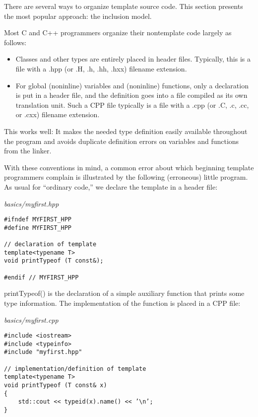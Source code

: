

There are several ways to organize template source code. This section presents the most popular approach: the inclusion model.


Most C and C++ programmers organize their nontemplate code largely as follows:

\begin{itemize}
\item
Classes and other types are entirely placed in header files. Typically, this is a file with a .hpp (or .H, .h, .hh, .hxx) filename extension.

\item
For global (noninline) variables and (noninline) functions, only a declaration is put in a header file, and the definition goes into a file compiled as its own translation unit. Such a CPP file typically is a file with a .cpp (or .C, .c, .cc, or .cxx) filename extension.
\end{itemize}

This works well: It makes the needed type definition easily available throughout the program and avoids duplicate definition errors on variables and functions from the linker.

With these conventions in mind, a common error about which beginning template programmers complain is illustrated by the following (erroneous) little program. As usual for “ordinary code,” we declare the template in a header file:

\noindent
\textit{basics/myfirst.hpp}
\begin{lstlisting}[style=styleCXX]
#ifndef MYFIRST_HPP
#define MYFIRST_HPP

// declaration of template
template<typename T>
void printTypeof (T const&);

#endif // MYFIRST_HPP
\end{lstlisting}

printTypeof() is the declaration of a simple auxiliary function that prints some type information. The implementation of the function is placed in a CPP file:


\noindent
\textit{basics/myfirst.cpp}
\begin{lstlisting}[style=styleCXX]
#include <iostream>
#include <typeinfo>
#include "myfirst.hpp"

// implementation/definition of template
template<typename T>
void printTypeof (T const& x)
{
	std::cout << typeid(x).name() << ’\n’;
}
\end{lstlisting}

